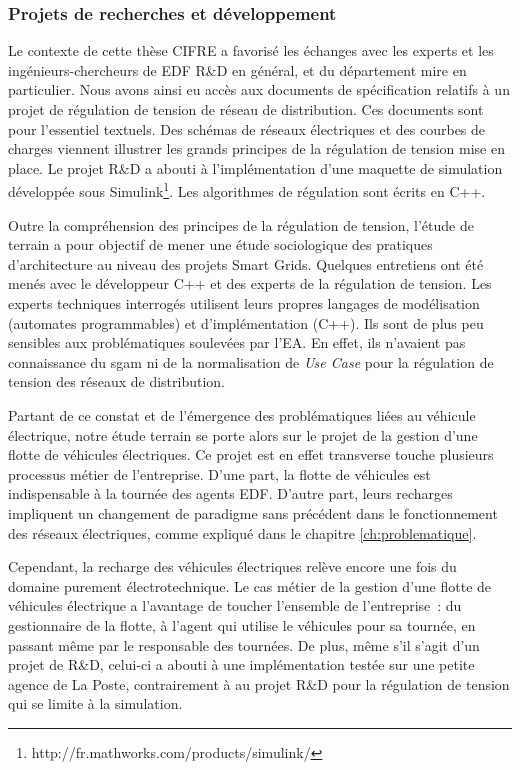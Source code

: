\subsubsection{Projets de recherches et développement}

Le contexte de cette thèse CIFRE a favorisé les échanges avec les experts et les
ingénieurs-chercheurs de EDF R\&D en général, et du département \gls{mire} en
particulier. Nous avons ainsi eu accès aux documents de spécification relatifs à
un projet de régulation de tension de réseau de distribution. Ces documents sont
pour l'essentiel textuels. Des schémas de réseaux électriques et des courbes de
charges viennent illustrer les grands principes de la régulation de tension
mise en place. Le projet R\&D a abouti à l'implémentation d'une maquette de
simulation développée sous
Simulink\footnote{http://fr.mathworks.com/products/simulink/}. Les algorithmes
de régulation sont écrits en C++.

Outre la compréhension des principes de la régulation de tension, l'étude de
terrain a pour objectif de mener une étude sociologique des pratiques
d'architecture au niveau des projets Smart Grids. Quelques entretiens ont été
menés avec le développeur C++ et des experts de la régulation de tension. Les
experts techniques interrogés utilisent leurs propres langages de modélisation
(automates programmables) et d'implémentation (C++). Ils sont de plus peu
sensibles aux problématiques soulevées par l'EA. En effet, ils n'avaient pas
connaissance du \gls{sgam} ni de la normalisation de \textit{Use Case} pour la
régulation de tension des réseaux de distribution.

Partant de ce constat et de l'émergence des problématiques liées au véhicule
électrique, notre étude terrain se porte alors sur le projet de la gestion
d'une flotte de véhicules électriques. Ce projet est en effet transverse touche plusieurs processus métier de
l'entreprise. D'une part, la flotte de véhicules est indispensable à la tournée
des agents EDF. D'autre part, leurs recharges impliquent un changement de
paradigme sans précédent dans le fonctionnement des réseaux électriques, comme
expliqué dans le chapitre \ref{ch:problematique}.

Cependant, la recharge des véhicules électriques relève encore une fois du
domaine purement électrotechnique. Le cas métier de la gestion d'une flotte de
véhicules électrique a l'avantage de toucher l'ensemble de l'entreprise~: du
gestionnaire de la flotte, à l'agent qui utilise le véhicules pour sa tournée,
en passant même par le responsable des tournées. De plus, même s'il s'agit d'un
projet de R\&D, celui-ci a abouti à une implémentation testée sur une petite
agence de La Poste, contrairement à au projet R\&D pour la régulation de
tension qui se limite à la simulation.

